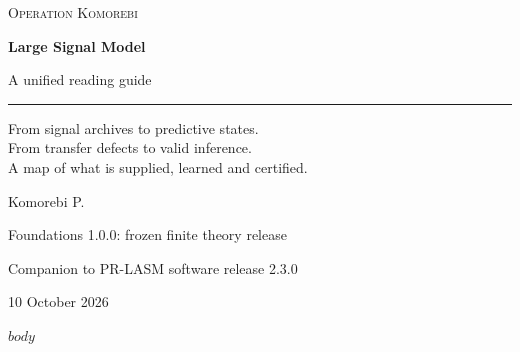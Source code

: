 \documentclass[11pt,letterpaper]{article}
\begin{document}
\hypersetup{pageanchor=false}
\begin{titlepage}
\vspace*{0.5in}
{\small\textsc{Operation Komorebi}\par}
\vspace{0.72in}
{\fontsize{33}{39}\selectfont\bfseries Large Signal Model\par}
\vspace{0.3in}
{\fontsize{21}{27}\selectfont A unified reading guide\par}
\vspace{0.45in}
\rule{\textwidth}{0.45pt}\par
\vspace{0.3in}
\begin{minipage}{0.95\textwidth}
\large
From signal archives to predictive states.\\From transfer defects to valid inference.\\A map of what is supplied, learned and certified.
\end{minipage}
\vfill
{\Large Komorebi P.\par}
\vspace{0.2in}
{\normalsize Foundations 1.0.0: frozen finite theory release\par}
{\normalsize Companion to PR-LASM software release 2.3.0\par}
{\normalsize 10 October 2026\par}
\end{titlepage}
\hypersetup{pageanchor=true}
$body$
\end{document}
